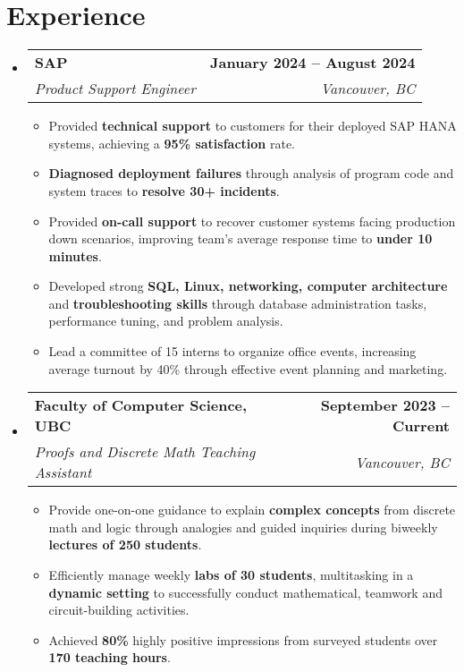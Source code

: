 \documentclass[letterpaper,11pt]{article}
\makeatletter
\newcommand{\resumeItem}[1]{
  \item\small{
    {#1 \vspace{-2pt}}
  }
}
\newcommand{\resumeSubheading}[4]{
  \vspace{-2pt}\item
    \begin{tabular*}{1.0\textwidth}[t]{l@{\extracolsep{\fill}}r}
      \textbf{#1} & \textbf{\small #2} \\
      \textit{\small#3} & \textit{\small #4} \\
    \end{tabular*}\vspace{-7pt}
}
\newcommand{\resumeSubHeadingListStart}{\begin{itemize}[leftmargin=0.0in, label={}]}
\newcommand{\resumeSubHeadingListEnd}{\end{itemize}}
\newcommand{\resumeItemListStart}{\begin{itemize}}
\newcommand{\resumeItemListEnd}{\end{itemize}\vspace{-5pt}}
\makeatother
\begin{document}
\section{Experience}
  \resumeSubHeadingListStart

    \resumeSubheading
      {SAP}{January 2024 -- August 2024}
      {Product Support Engineer}{Vancouver, BC}
      \resumeItemListStart
        \resumeItem{Provided \textbf{technical support} to customers for their deployed SAP HANA systems, achieving a \textbf{95\% satisfaction} rate.}
        \resumeItem{\textbf{Diagnosed deployment failures} through analysis of program code and system traces to \textbf{resolve 30+ incidents}.}
        \resumeItem{Provided \textbf{on-call support} to recover customer systems facing production down scenarios, improving team’s average response time to \textbf{under 10 minutes}.}
        \resumeItem{Developed strong \textbf{SQL, Linux, networking, computer architecture} and \textbf{troubleshooting skills} through database administration tasks, performance tuning, and problem analysis.}
        \resumeItem{Lead a committee of 15 interns to organize office events, increasing average turnout by 40\% through effective event planning and marketing.}
      \resumeItemListEnd

    \resumeSubheading
      {Faculty of Computer Science, UBC}{September 2023 -- Current}
      {Proofs and Discrete Math Teaching Assistant}{Vancouver, BC}
      \resumeItemListStart
        \resumeItem{Provide one-on-one guidance to explain \textbf{complex concepts} from discrete math and logic through analogies and guided inquiries during biweekly \textbf{lectures of 250 students}.}
        \resumeItem{Efficiently manage weekly \textbf{labs of 30 students}, multitasking in a \textbf{dynamic setting} to successfully conduct mathematical, teamwork and circuit-building activities.}
        \resumeItem{Achieved \textbf{80\%} highly positive impressions from surveyed students over \textbf{170 teaching hours}.}
    \resumeItemListEnd
    
  \resumeSubHeadingListEnd
\vspace{-16pt}

\end{document}
